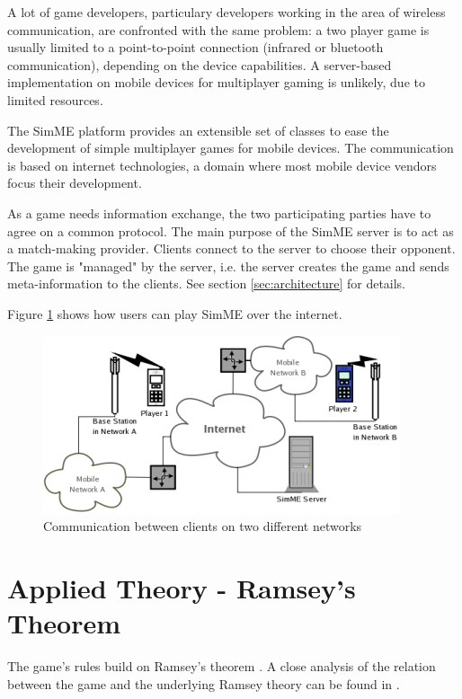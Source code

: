 	A lot of game developers, particulary developers working in the area of
	wireless communication, are confronted with the same problem: a two player
	game is usually limited to a point-to-point connection (infrared or
	bluetooth communication), depending on the device capabilities. A
	server-based implementation on mobile devices for multiplayer gaming is
	unlikely, due to limited resources.

	The SimME platform provides an extensible set of classes to ease the
	development of simple multiplayer games for mobile devices. The
	communication is based on internet technologies, a domain where most mobile
	device vendors focus their development.

	As a game needs information exchange, the two participating parties have to
	agree on a common protocol. The main purpose of the SimME server is to act
	as a match-making provider. Clients connect to the server to choose their
	opponent. The game is "managed" by the server, i.e. the server creates the
	game and sends meta-information to the clients. See section
	\ref{sec:architecture} for details.

	Figure \ref{fig:communication} shows how users can play SimME over the
	internet.

	\begin{figure}[htbp]
		\begin{center}
			\includegraphics{pics/communication-small.png}
			\caption{Communication between clients on two different networks}
			\label{fig:communication}
		\end{center}
	\end{figure}


\section{Applied Theory - Ramsey's Theorem}

	The game's rules build on Ramsey's theorem \cite{wiki}. A close analysis of
	the relation between the game and the underlying Ramsey theory can be found
	in \cite{slany_paper}.


